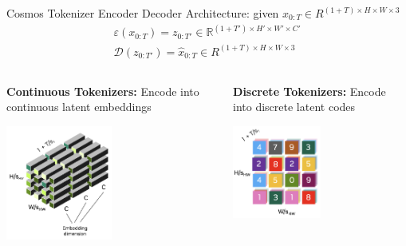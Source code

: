 \documentclass{beamer}
\begin{document}
\begin{frame}[t]{Cosmos Tokenizer}
    Encoder Decoder Architecture: given $x_{0:T} \in R^{(1+T) \times H \times W \times 3}$
        \begin{gather}\label{eq:1}
            \varepsilon(x_{0:T}) = z_{0:T'} \in \mathbb{R}^{(1+T') \times H' \times W' \times C'}  \\
            \mathcal{D}(z_{0:T'}) = \hat{x}_{0:T} \in R^{(1+T) \times H \times W \times 3}
        \end{gather}
	\begin{columns}[t]
		\begin{column}{.5\textwidth}
            \textbf{Continuous Tokenizers:} Encode into continuous latent embeddings \newline
            \vspace{-1.5em}
			\begin{center}
                \includegraphics[width=0.5\textwidth]{./img/tokenizer_cont.png}
			\end{center}
		\end{column}
		\begin{column}{.5\textwidth}
            \textbf{Discrete Tokenizers:} Encode into discrete latent codes
            \vspace{-0.5em}
			\begin{center}
                \includegraphics[width=0.5\textwidth]{./img/tokenizer_discrete.png}

\end{center}
\end{column}
\end{columns}
\end{frame}
\end{document}
